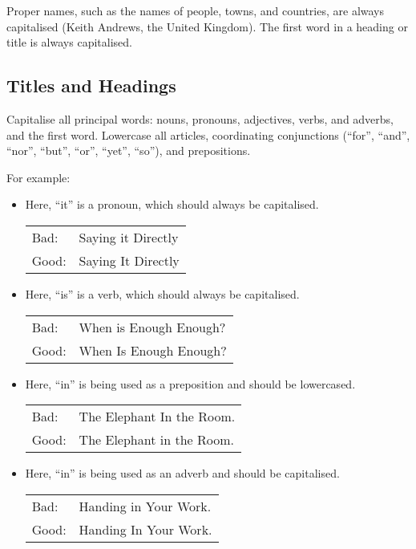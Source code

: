 Proper names, such as the names of people, towns, and countries, are
always capitalised (Keith Andrews, the United Kingdom). The first word
in a heading or title is always capitalised.



\subsection{Titles and Headings}

Capitalise all principal words: nouns, pronouns, adjectives, verbs,
and adverbs, and the first word. Lowercase all articles, coordinating
conjunctions (``for'', ``and'', ``nor'', ``but'', ``or'', ``yet'',
``so''), and prepositions.

For example:
\begin{itemize}

\item Here, ``it'' is a pronoun, which should always be capitalised.

\begin{tabular}{lp{0.9\hsize}}
Bad:  & Saying it Directly \\
Good: & Saying It Directly \\
\end{tabular}



\item Here, ``is'' is a verb, which should always be capitalised.

\begin{tabular}{lp{0.9\hsize}}
Bad:  & When is Enough Enough? \\
Good: & When Is Enough Enough? \\
\end{tabular}



\item Here, ``in'' is being used as a preposition and should be 
lowercased.

\begin{tabular}{lp{0.9\hsize}}
Bad:  & The Elephant In the Room. \\
Good: & The Elephant in the Room. \\
\end{tabular}


\item Here, ``in'' is being used as an adverb and should be 
capitalised.

\begin{tabular}{lp{0.9\hsize}}
Bad:  & Handing in Your Work. \\
Good: & Handing In Your Work. \\
\end{tabular}


\end{itemize}

